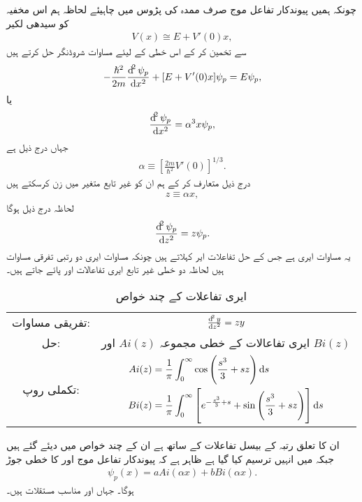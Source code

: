چونکہ ہمیں پیوندکار تفاعل موج  صرف ممدہ کی پڑوس میں چاہیئے لحاظہ ہم اس مخفیہ کو سیدھی لکیر 
\begin{align}
	V(x) \cong E + V'(0)x,
\end{align}
سے تخمین کر کے اس خطی  کے لیئے مساوات شروڈنگر حل کرتے ہیں
\begin{align*}
	-\frac{\hslash^{2}}{2m} \frac{\dif^{2}\psi_{p}}{\dif x^{2}} +[E+V'(0)x]\psi_{p}=E\psi_{p},
\end{align*}
یا 
\begin{align}
	\frac{\dif^{2} \psi_{p}}{\dif x^{2}} = \alpha^{3} x\psi_{p},
\end{align}
جہاں درج ذیل ہے
\begin{align}
	\alpha\equiv\left[\frac{2m}{\hslash^{2}} V'(0)\right]^{1/3}.
\end{align}
درج ذیل متعارف کر کے ہم ان  کو غیر تابع متغیر میں زن کرسکتے ہیں
\begin{align}
	z\equiv\alpha x,
\end{align}
لحاظہ درج ذیل ہوگا
\begin{align}
	\frac{\dif^{2}\psi_{p}}{\dif z^{2}}=z\psi_{p}.
\end{align}
یہ مساوات ایری ہے جس کے حل تفاعلات ایر کہلاتے ہیں چونکہ مساوات ایری دو رتبی تفرقی مساوات ہیں لحاظہ دو خطی غیر تابع ایری تفاعالات  اور  پائے جاتے ہیں۔
\begin{table}[h!]
\centering
\caption{ایری تفاعلات کے چند خواص}
\label{table:1}
\begin{tabular}{|c c|}
\hline
تفریقی مساوات: & $\frac{\dif^2y}{\dif z^2}=zy$\\
حل: & ایری تفاعالات کے خطی مجموعہ $Ai(z)$ اور $Bi(z)$ \\
تکملی روپ: & 
{$\begin{aligned}
Ai(z)&=\frac{1}{\pi}\int_{0}^{\infty}\cos\left(\frac{s^3}{3}+sz\right)\dif s \\
Bi(z)&=\frac{1}{\pi}\int_{0}^{\infty}\left[e^{-\frac{s^3}{3}+s}+\sin\left(\frac{s^3}{3}+sz\right)\right]\dif s
\end{aligned}$}\\
\hline
\end{tabular}
\end{table}
ان کا تعلق رتبہ  کے بیسل تفاعلات کے ساتھ ہے ان کے چند خواص  میں دیئے گئے ہیں جبکہ  میں انہیں ترسیم کیا گیا ہے ظاہر ہے کہ پیوندکار تفاعل موج  اور  کا خطی جوڑ 
\begin{align}
	\psi_{p}(x) = aAi(\alpha x)+ bBi(\alpha x).
\end{align}
ہوگا۔ جہاں  اور  مناسب مستقلات ہیں۔

